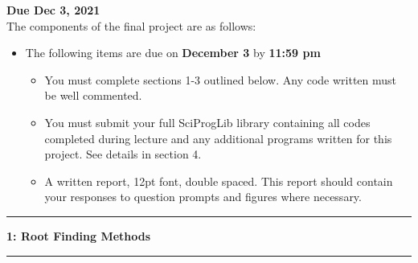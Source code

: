 \documentclass[11pt]{article}
\newcommand\question[2]{\vspace{.25in}\hrule\textbf{#1: #2}\vspace{.5em}\hrule\vspace{.10in}}
\begin{document}
\raggedright
\newcommand\Page{\page  / \lastPage}
\newcommand\page{1}
\newcommand\qN[2]{\Large {#1} \small{#2} \normalsize}

\newcommand\dueDate{\today}
\newcommand\hwnum{6}
\newcommand\ExNum{}

\newcommand\lastPage{3}


\centering
\textbf{Due Dec 3, 2021}\\
\hrulefill
\flushleft
\vspace{1cm}
The components of the final project are as follows:
\begin{itemize}
	\item The following items are due on \textbf{December 3} by \textbf{11:59 pm}
	\begin{itemize}
		\item You must complete sections 1-3 outlined below. Any code written must be well commented.
		\item You must submit your full SciProgLib library containing all codes completed during lecture and any additional programs written for this project. See details in section 4.
		\item A written report, 12pt font, double spaced. This report should contain your responses to question prompts and figures where necessary.		
	\end{itemize}
\end{itemize}
\newpage
\question{1}{Root Finding Methods}
\end{document}
